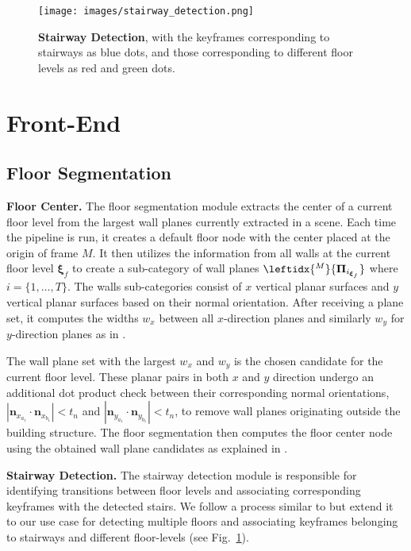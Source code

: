 \begin{figure}[t]
  \centering
  \texttt{[image: images/stairway\_detection.png]}
  \caption{\textbf{Stairway Detection}, with the keyframes corresponding to stairways as blue dots, and those corresponding to different floor levels as red and green dots.}
  \label{fig:stairway_detection}
\end{figure}

\section{Front-End}

\subsection{Floor Segmentation}

\textbf{Floor Center.} The floor segmentation module extracts the center of a current floor level from the largest wall planes currently extracted in a scene. Each time the pipeline is run, it creates a default floor node with the center placed at the origin of frame $M$. It then utilizes the information from all walls at the current floor level $\boldsymbol{\xi}_f$ to create a sub-category of wall planes $\leftidx{^M}{\boldsymbol{\Pi}_{i_{\boldsymbol{\xi}_f}}}$ where $i=\{1, \hdots, T \}$. The walls sub-categories consist of $x$ vertical planar surfaces and $y$ vertical planar surfaces based on their normal orientation. After receiving a plane set, it computes the widths ${w}_x$ between all $x$-direction planes and similarly ${w}_y$ for $y$-direction planes as in \cite{s_graphs+}. 

The wall plane set with the largest $w_x$ and $w_y$ is the chosen candidate for the current floor level. These planar pairs in both $x$ and $y$ direction undergo an additional dot product check between their corresponding normal orientations, $|\mathbf{n}_{x_{a_1}} \cdot \mathbf{n}_{x_{b_1}}| < t_n$ and $|\mathbf{n}_{y_{a_1}} \cdot \mathbf{n}_{y_{b_1}}| < t_n$, to remove wall planes originating outside the building structure. The floor segmentation then computes the floor center node using the obtained wall plane candidates as explained in \cite{s_graphs+}.  

\textbf{Stairway Detection.} 
The stairway detection module is responsible for identifying transitions between floor levels and associating corresponding keyframes with the detected stairs. We follow a process similar to \cite{lexis} but extend it to our use case for detecting multiple floors and associating keyframes belonging to stairways and different floor-levels (see Fig.~\ref{fig:stairway_detection}). 

